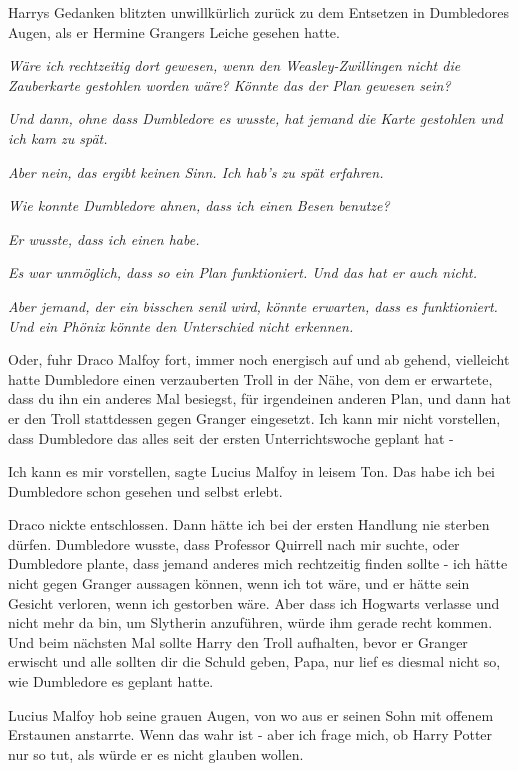Harrys Gedanken blitzten unwillkürlich zurück zu dem Entsetzen in Dumbledores
Augen, als er Hermine Grangers Leiche gesehen hatte.

\emph{Wäre ich rechtzeitig dort gewesen, wenn den Weasley-Zwillingen nicht die
Zauberkarte gestohlen worden wäre? Könnte das der Plan gewesen sein?}

\emph{Und dann, ohne dass Dumbledore es wusste, hat jemand die Karte gestohlen
und ich kam zu spät.}

\emph{Aber nein, das ergibt keinen Sinn. Ich hab's zu spät erfahren.}

\emph{Wie konnte Dumbledore ahnen, dass ich einen Besen benutze?}

\emph{Er wusste, dass ich einen habe.}

\emph{Es war unmöglich, dass so ein Plan funktioniert. Und das hat er auch
nicht.}

\emph{Aber jemand, der ein bisschen senil wird, könnte erwarten, dass es
funktioniert.}
\emph{Und ein Phönix könnte den Unterschied nicht erkennen.}

\glqq{}Oder\grqq{}, fuhr Draco Malfoy fort, immer noch energisch auf und ab
gehend, \glqq{}vielleicht hatte Dumbledore einen verzauberten Troll in der Nähe,
von dem er erwartete, dass du ihn ein anderes Mal besiegst, für irgendeinen
anderen Plan, und dann hat er den Troll stattdessen gegen Granger eingesetzt.
Ich kann mir nicht vorstellen, dass Dumbledore das alles seit der ersten
Unterrichtswoche geplant hat -\grqq{}

\glqq{}Ich kann es mir vorstellen\grqq{}, sagte Lucius Malfoy in leisem Ton.
\glqq{}Das habe ich bei Dumbledore schon gesehen und selbst erlebt.\grqq{}

Draco nickte entschlossen. \glqq{}Dann hätte ich bei der ersten Handlung nie
sterben dürfen. Dumbledore wusste, dass Professor Quirrell nach mir suchte, oder
Dumbledore plante, dass jemand anderes mich rechtzeitig finden sollte - ich
hätte nicht gegen Granger aussagen können, wenn ich tot wäre, und er hätte sein
Gesicht verloren, wenn ich gestorben wäre. Aber dass ich Hogwarts verlasse und
nicht mehr da bin, um Slytherin anzuführen, würde ihm gerade recht kommen. Und
beim nächsten Mal sollte Harry den Troll aufhalten, bevor er Granger erwischt
und alle sollten dir die Schuld geben, Papa, nur lief es diesmal nicht so, wie
Dumbledore es geplant hatte.\grqq{}

Lucius Malfoy hob seine grauen Augen, von wo aus er seinen Sohn mit offenem
Erstaunen anstarrte. \glqq{}Wenn das wahr ist - aber ich frage mich, ob Harry
Potter nur so tut, als würde er es nicht glauben wollen.\grqq{}

